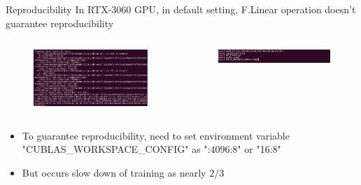 \documentclass[8pt]{beamer}
\begin{document}
\begin{frame}{Reproducibility}
    In RTX-3060 GPU, in default setting, F.Linear operation doesn't guarantee reproducibility
    \begin{columns}
        \begin{column}{0.5\textwidth}
            \begin{figure}
                \centering
                \includegraphics[width=1.0\textwidth]{CuBLASIssue.png}
            \end{figure}
        \end{column}
        \begin{column}{0.5\textwidth}
            \begin{figure}
                \begin{center}
                    \includegraphics[width=1.0\textwidth]{CublasEnvironmentVariable.png}
                \end{center}
            \end{figure}
        \end{column}
    \end{columns}
    \begin{itemize}
        \item To guarantee reproducibility, need to set environment variable "CUBLAS\_WORKSPACE\_CONFIG" as ":4096:8" or "16:8"
        \item But occurs slow down of training as nearly $2/3$
    \end{itemize}
\end{frame}
\end{document}
